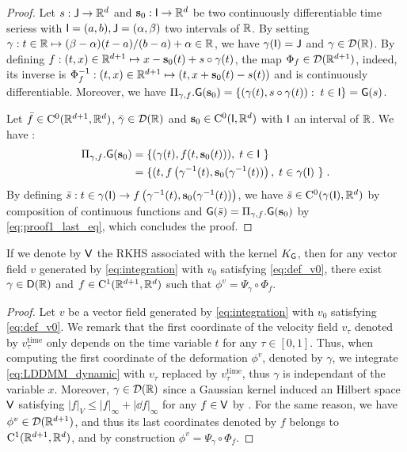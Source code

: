 \begin{proof}
  Let $s:  \mathsf{J} \to \mathbb{R}^d  $ and $\mathbf{s}_0: \mathsf{I}\to \mathbb{R}^d $ be two continuously differentiable time seriess with $\mathsf{I}=(a,b),\mathsf{J}=(\alpha,\beta)$ two intervals of $\mathbb{R}$.
  By setting $\gamma: t\in \mathbb{R} \mapsto (\beta-\alpha)(t-a)/(b-a)+\alpha\in \mathbb{R} $, we have $ \gamma(\mathsf{I})=\mathsf{J}$ and $\gamma \in \mathcal{D}(\mathbb{R}) $.
   By defining $f:(t,x)\in\mathbb{R}^{d+1}\mapsto x-\mathbf{s}_0(t)+s\circ \gamma(t) $, the map $\Phi_f\in \mathcal{D}(\mathbb{R}^{d+1})$,
    indeed, its inverse is $\Phi_f^{-1}:(t,x)\in\mathbb{R}^{d+1}\mapsto (t,x+\mathbf{s}_0(t)-s(t)) $ and is continuously differentiable.
     Moreover, we have $\Pi_{\gamma,f}.\mathsf{G}(\mathbf{s}_0)=\{(\gamma(t),s\circ \gamma(t)):\; t\in\mathsf{I} \}=\mathsf{G}(s) $.

    

    Let $\bar{f}\in \mathrm{C}^0(\mathbb{R}^{d+1},\mathbb{R}^d)$, $\bar{\gamma}\in  \mathcal{D}(\mathbb{R}) $ and $\mathbf{s}_0\in \mathrm{C}^0(\mathsf{I},\mathbb{R}^d)$ with $\mathsf{I}$ an interval of $\mathbb{R}$.
    We have :
    \begin{align}
      \Pi_{\gamma,f}.\msg(\mathbf{s}_0)&=\{(\gamma(t),f(t,\mathbf{s}_0(t))),\eqsp t\in \msi \} \\
      &\label{eq:proof1_last_eq}=\{(t,f\left(\gamma^{-1}(t),\mathbf{s}_0(\gamma^{-1}(t))\right),\eqsp t\in \gamma(\msi) \} \eqsp .
    \end{align}
    By defining $\bar{s}:t\in \gamma(\mathsf{I})\to f\left(\gamma^{-1}(t),\mathbf{s}_0(\gamma^{-1}(t))\right) $, we have $\bar{s}\in \mathrm{C}^0(\gamma(\mathsf{I}), \mathbb{R}^d) $ by composition of continuous functions
    and $ \mathsf{G}(\bar{s})= \Pi_{\gamma,f}.\mathsf{G}(\mathbf{s}_0)$ by \eqref{eq:proof1_last_eq}, which concludes the proof.
\end{proof}
\begin{lemma}
  If we denote by $\mathsf{V}$ the RKHS associated with the kernel $K_{\mathsf{G}}$, then for any vector field $v$ generated by \eqref{eq:integration} with $v_0$ satisfying \eqref{eq:def_v0},
   there exist $\gamma \in \mathsf{D}(\mathbb{R}) $ and $f\in \mathrm{C}^1(\mathbb{R}^{d+1},\mathbb{R}^d)$ such that $\phi^v=\Psi_\gamma\circ\Phi_f $.
\end{lemma}
\begin{proof}
  Let $v$ be a vector field generated by \eqref{eq:integration} with $v_0$ satisfying \eqref{eq:def_v0}.
 We remark that the first coordinate of the velocity field $v_\tau$ denoted by $v_\tau^{\text{time}}$ only depends on the time variable $t$ for any $\tau\in[0,1]$.
 Thus, when computing the first coordinate of the deformation $\phi^v$, denoted by $\gamma$, we integrate \eqref{eq:LDDMM_dynamic} with $v_\tau$ replaced by $v_\tau^{\text{time}}$,
  thus $\gamma$ is independant of the variable $x$. Moreover, $\gamma\in \mathcal{D}(\mathbb{R})$ since a Gaussian kernel induced an Hilbert space $\mathsf{V}$ satisfying $|f|_V\leq |f|_\infty+ |\dd f|_\infty  $ for any $f\in \mathsf{V}$ by \citep[Theorem 9]{glaunes2005transport}.
  For the same reason, we have $\phi^v\in \mathcal{D}(\mathbb{R}^{d+1})$, and thus its last coordinates denoted by $f$ belongs to $\mathrm{C}^1(\mathbb{R}^{d+1},\mathbb{R}^d)$, and by construction $\phi^v=\Psi_\gamma\circ\Phi_f $.
\end{proof}




